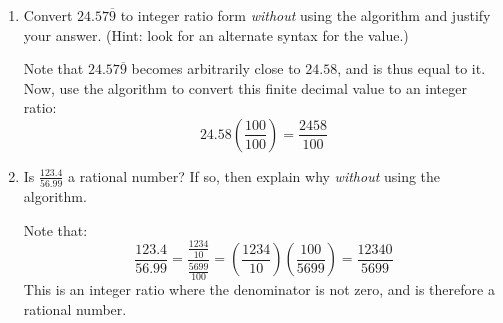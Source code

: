 \documentclass[letterpaper,12pt,fleqn]{article}
\begin{document}
\begin{enumerate}
\item Convert \(24.57\overline{9}\) to integer ratio form \emph{without} using the algorithm and justify your
  answer.  (Hint: look for an alternate syntax for the value.)

  Note that \(24.57\overline{9}\) becomes arbitrarily close to \(24.58\), and is thus equal to it.  Now, use the
  algorithm to convert this finite decimal value to an integer ratio:
  \[24.58\left(\frac{100}{100}\right)=\frac{2458}{100}\]

\item Is \(\displaystyle\frac{123.4}{56.99}\) a rational number?  If so, then explain why \emph{without} using the
  algorithm.

  Note that:
  \[\frac{123.4}{56.99}=\frac{\frac{1234}{10}}{\frac{5699}{100}}=
  \left(\frac{1234}{10}\right)\left(\frac{100}{5699}\right)=\frac{12340}{5699}\]
  This is an integer ratio where the denominator is not zero, and is therefore a rational number.
\end{enumerate}
\end{document}
